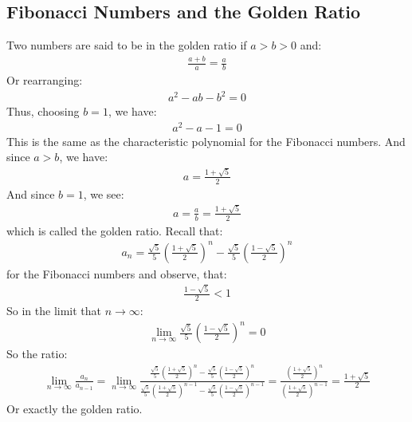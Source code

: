 \documentclass{article}
\begin{document}
\subsection*{Fibonacci Numbers and the Golden Ratio}
Two numbers are said to be in the golden ratio if $a > b > 0$ and:
\begin{gather*}
	\frac{a + b}{a} = \frac{a}{b}
\end{gather*}
Or rearranging:
\begin{gather*}
	a^{2} - ab - b^{2} = 0
\end{gather*}
Thus, choosing $b = 1$, we have:
\begin{gather*}
	a^{2} - a - 1 = 0
\end{gather*}
This is the same as the characteristic polynomial for the Fibonacci numbers. And since $a > b$, we have:
\begin{gather*}
	a = \frac{1 + \sqrt{5}}{2}
\end{gather*}
And since $b = 1$, we see:
\begin{gather*}
	a = \frac{a}{b} = \frac{1 + \sqrt{5}}{2}
\end{gather*}
which is called the golden ratio. Recall that:
\begin{gather*}
	a_{n} = \frac{\sqrt{5}}{5}\left(\frac{1 + \sqrt{5}}{2}\right)^{n} -\frac{\sqrt{5}}{5}\left(\frac{1 - \sqrt{5}}{2}\right)^{n} 
\end{gather*}
for the Fibonacci numbers and observe, that:
\begin{gather*}
	\frac{1 - \sqrt{5}}{2} < 1
\end{gather*}
So in the limit that $n \rightarrow \infty$:
\begin{gather*}
	\lim_{n \rightarrow \infty} \frac{\sqrt{5}}{5}\left(\frac{1 - \sqrt{5}}{2}\right)^{n} = 0
\end{gather*}
So the ratio:
\begin{gather*}
	\lim_{n \rightarrow \infty}\frac{a_{n}}{a_{n - 1}} = \lim_{n \rightarrow \infty} \frac{\frac{\sqrt{5}}{5}\left(\frac{1 + \sqrt{5}}{2}\right)^{n} -\frac{\sqrt{5}}{5}\left(\frac{1 - \sqrt{5}}{2}\right)^{n}}{\frac{\sqrt{5}}{5}\left(\frac{1 + \sqrt{5}}{2}\right)^{n - 1} -\frac{\sqrt{5}}{5}\left(\frac{1 - \sqrt{5}}{2}\right)^{n - 1}} = \frac{\left(\frac{1 + \sqrt{5}}{2}\right)^{n}}{\left(\frac{1 + \sqrt{5}}{2}\right)^{n - 1}} = \frac{1 + \sqrt{5}}{2} 
\end{gather*}
Or exactly the golden ratio.
\end{document}
